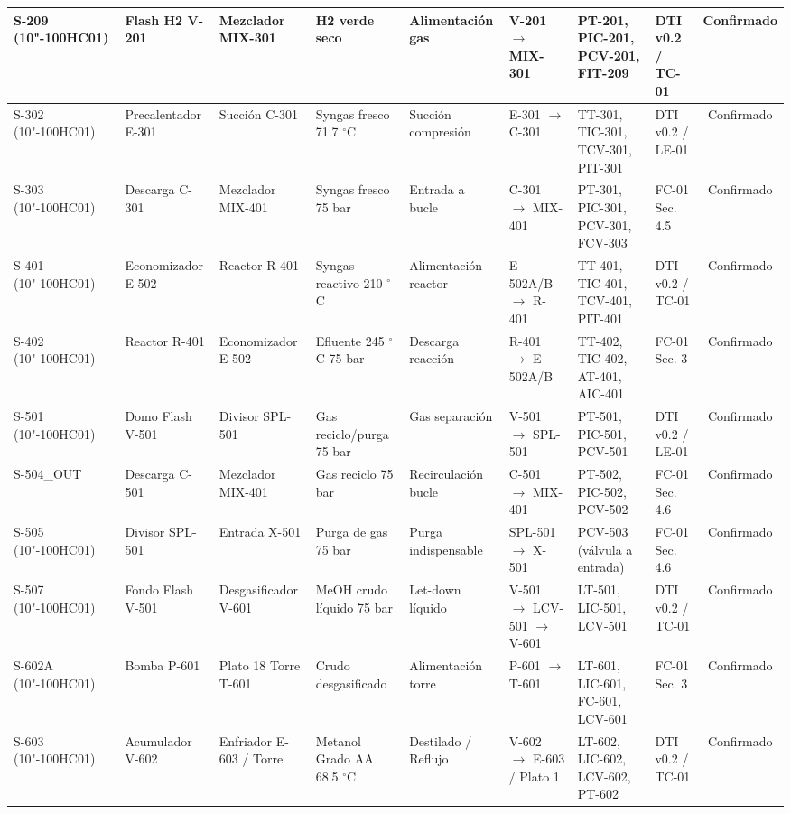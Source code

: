 \documentclass[10pt,letterpaper]{article}
\begin{document}
\begin{landscape}
\begin{xltabular}{\linewidth}{|p{2.4cm}|p{1.8cm}|p{1.8cm}|p{1.8cm}|p{1.6cm}|p{2.2cm}|>{\raggedright\arraybackslash}X|p{1.8cm}|c|}
S-209 (10"-100HC01) & Flash H2 V-201 & Mezclador MIX-301 & H2 verde seco & Alimentación gas & V-201 $\to$ MIX-301 & PT-201, PIC-201, PCV-201, FIT-209 & DTI v0.2 / TC-01 & Confirmado \\ \hline
S-302 (10"-100HC01) & Precalentador E-301 & Succión C-301 & Syngas fresco 71.7 $^\circ$C & Succión compresión & E-301 $\to$ C-301 & TT-301, TIC-301, TCV-301, PIT-301 & DTI v0.2 / LE-01 & Confirmado \\ \hline
S-303 (10"-100HC01) & Descarga C-301 & Mezclador MIX-401 & Syngas fresco 75 bar & Entrada a bucle & C-301 $\to$ MIX-401 & PT-301, PIC-301, PCV-301, FCV-303 & FC-01 Sec. 4.5 & Confirmado \\ \hline
S-401 (10"-100HC01) & Economizador E-502 & Reactor R-401 & Syngas reactivo 210 $^\circ$C & Alimentación reactor & E-502A/B $\to$ R-401 & TT-401, TIC-401, TCV-401, PIT-401 & DTI v0.2 / TC-01 & Confirmado \\ \hline
S-402 (10"-100HC01) & Reactor R-401 & Economizador E-502 & Efluente 245 $^\circ$C 75 bar & Descarga reacción & R-401 $\to$ E-502A/B & TT-402, TIC-402, AT-401, AIC-401 & FC-01 Sec. 3 & Confirmado \\ \hline
S-501 (10"-100HC01) & Domo Flash V-501 & Divisor SPL-501 & Gas reciclo/purga 75 bar & Gas separación & V-501 $\to$ SPL-501 & PT-501, PIC-501, PCV-501 & DTI v0.2 / LE-01 & Confirmado \\ \hline
S-504\_\allowbreak OUT & Descarga C-501 & Mezclador MIX-401 & Gas reciclo 75 bar & Recirculación bucle & C-501 $\to$ MIX-401 & PT-502, PIC-502, PCV-502 & FC-01 Sec. 4.6 & Confirmado \\ \hline
S-505 (10"-100HC01) & Divisor SPL-501 & Entrada X-501 & Purga de gas 75 bar & Purga indispensable & SPL-501 $\to$ X-501 & PCV-503 (válvula a entrada) & FC-01 Sec. 4.6 & Confirmado \\ \hline
S-507 (10"-100HC01) & Fondo Flash V-501 & Desgasificador V-601 & MeOH crudo líquido 75 bar & Let-down líquido & V-501 $\to$ LCV-501 $\to$ V-601 & LT-501, LIC-501, LCV-501 & DTI v0.2 / TC-01 & Confirmado \\ \hline
S-602A (10"-100HC01) & Bomba P-601 & Plato 18 Torre T-601 & Crudo desgasificado & Alimentación torre & P-601 $\to$ T-601 & LT-601, LIC-601, FC-601, LCV-601 & FC-01 Sec. 3 & Confirmado \\ \hline
S-603 (10"-100HC01) & Acumulador V-602 & Enfriador E-603 / Torre & Metanol Grado AA 68.5 $^\circ$C & Destilado / Reflujo & V-602 $\to$ E-603 / Plato 1 & LT-602, LIC-602, LCV-602, PT-602 & DTI v0.2 / TC-01 & Confirmado \\ \hline

\end{xltabular}
\end{landscape}
\end{document}
